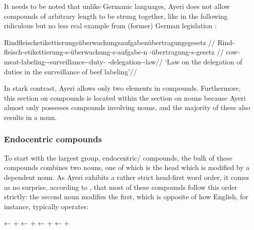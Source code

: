 It needs to be noted that unlike Germanic languages, Ayeri does not allow 
compounds of arbitrary length to be strung together, like in the following 
ridiculous but no less real example from (former) German legislation 
\parencite[see, for instance,][]{sz:rindfleisch}:

\ex\begingl{}%
	\gla %
Rindfleisch­etikettierungs­überwachungs­aufgabenübertragungsgesetz 
//
	\glb Rind-fleisch-­etikettierung-s-­überwachung-s­-aufgabe-n%
		-übertragung-s-gesetz //
	\glc cow-meat-labeling-\Lnk{}-surveillance-\Lnk{}-duty-\Lnk{}%
		-delegation-\Lnk{}-law//
	\glft `Law on the delegation of duties in the surveillance of beef 
		labeling'//
\endgl\xe

In stark contrast, Ayeri allows only two elements in compounds. Furthermore, 
this section on compounds is located within the section on nouns because Ayeri 
almost only possesses compounds involving nouns, and the majority of these also 
results in a noun.

\subsubsection{Endocentric compounds}

To start with the largest group, endocentric/ compounds, the bulk 
of these compounds combines two nouns, one of which is the head which is 
modified by a dependent noun. As Ayeri exhibits a rather strict head-first word 
order, it comes as no surprise, according to \citet{gaeta2008}, that most of 
these compounds follow this order strictly: the second noun modifies the first, 
which is opposite of how English, for instance, typically 
operates:

\pex\label{ex:endonoun}
	\a {}
		← 
		+ 
	\a {}
		← 
		+ \footnotemark
	\a {}
		← 
		+ 
	\a {}
		← 
		+ 
\xe


